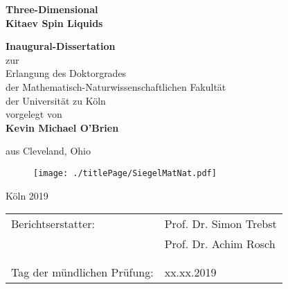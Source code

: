 \begin{titlepage}

	\vspace*{\fill}
	\begin{center}
		
		{\Huge\textbf{Three-Dimensional\\
				\vspace{0.5cm}
				Kitaev Spin Liquids}}\\
		\vspace{1.5cm}
	
		\doublespacing
		\textbf{Inaugural-Dissertation}\\
		zur\\
		Erlangung des Doktorgrades\\
		der Mathematisch-Naturwissenschaftlichen Fakult\"{a}t\\
		der Universit\"{a}t zu K\"{o}ln\\
		vorgelegt von\\
		
		\vspace{0.5cm}
		{\Large\textbf{Kevin Michael O'Brien}}\\
		\vspace{0.5cm}

		\normalsize
		aus Cleveland, Ohio\\

		\vspace{1.cm}		
		\begin{figure}[h!]
			\centering
			\texttt{[image: ./titlePage/SiegelMatNat.pdf]}
		\end{figure}
		\vspace{1.0cm}
				
		K\"{o}ln 2019
	\end{center}
	\vspace*{\fill}

\end{titlepage}

\onehalfspacing


\noindent
\begin{tabular}{ll}
	Berichtserstatter: \hspace{2cm} & Prof. Dr. Simon Trebst \\
		   & Prof. Dr. Achim Rosch\\
		   & \\
		   & \\
	Tag der m\"{u}ndlichen Pr\"{u}fung: & xx.xx.2019
\end{tabular}